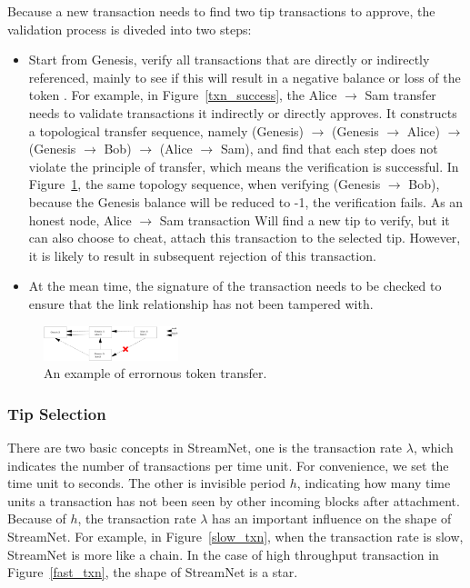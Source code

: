 Because a new transaction needs to find two tip transactions to approve, the validation process is diveded into two steps:

\begin{itemize}
\item Start from Genesis, verify all transactions that are directly or indirectly referenced, 
mainly to see if this will result in a negative balance or loss of the token \cite{gal_2018}.
For example, in Figure~\ref{txn_success}, the Alice $\rightarrow$ Sam transfer needs to validate transactions it indirectly or directly approves.
It constructs a topological transfer sequence, 
namely (Genesis) $\rightarrow$ (Genesis $\rightarrow$ Alice) $\rightarrow$ (Genesis $\rightarrow$ Bob) $\rightarrow$ (Alice $\rightarrow$ Sam),
and find that each step does not violate the principle of transfer, which means the verification is successful.
In Figure~\ref{txn_fail}, the same topology sequence, when verifying (Genesis $\rightarrow$ Bob), 
because the Genesis balance will be reduced to -1, the verification fails.
As an honest node, Alice $\rightarrow$ Sam transaction Will find a new tip to verify,
but it can also choose to cheat, attach this transaction to the selected tip.
However, it is likely to result in subsequent rejection of this transaction.
\item At the mean time, the signature of the transaction needs to be checked to ensure that the link relationship has not been tampered with.
\end{itemize}

\begin{figure}[!ht]
\begin{center}
\includegraphics[width=0.35\textwidth]{figures/txn_fail.eps}
    \caption{
        An example of errornous token transfer.
     }
\label{txn_fail}
\end{center}
\end{figure}

\subsubsection{Tip Selection}
There are two basic concepts in StreamNet, one is the transaction rate $\lambda$, which indicates the number of transactions per time unit.
For convenience, we set the time unit to seconds.
The other is invisible period $h$, indicating how many time units a transaction has not been seen by other incoming blocks after attachment.
Because of $h$, the transaction rate $\lambda$ has an important influence on the shape of StreamNet.
For example, in Figure~\ref{slow_txn}, when the transaction rate is slow, StreamNet is more like a chain.
In the case of high throughput transaction in Figure~\ref{fast_txn}, the shape of StreamNet is a star.

